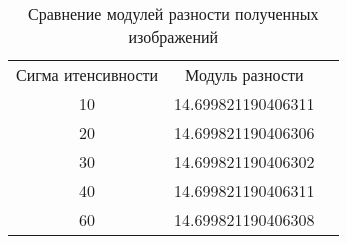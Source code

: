 \begin{figure}[H]
	\begin{minipage}[h]{0.49\linewidth}
	\end{minipage}
	\hfill
	\begin{minipage}[h]{0.49\linewidth}
	\end{minipage}
	\vfill
	\begin{minipage}[h]{0.49\linewidth}
	\end{minipage}
	\hfill
	\begin{minipage}[h]{0.49\linewidth}
	\end{minipage}
	\vfill
	\begin{minipage}[h]{0.49\linewidth}
	\end{minipage}
	\hfill
	\begin{minipage}[h]{0.49\linewidth}
	\end{minipage}
\end{figure}

\begin{table}[H]
	\caption{Сравнение модулей разности полученных изображений}
	\label{tabular:timesandtenses}
	\begin{center}
		\begin{tabular}{ccc}
			Сигма итенсивности & Модуль разности \\
			10 & 14.699821190406311 \\
			20 & 14.699821190406306 \\
			30 & 14.699821190406302 \\
			40 & 14.699821190406311 \\
			60 & 14.699821190406308 \\
		\end{tabular}
	\end{center}
\end{table}

